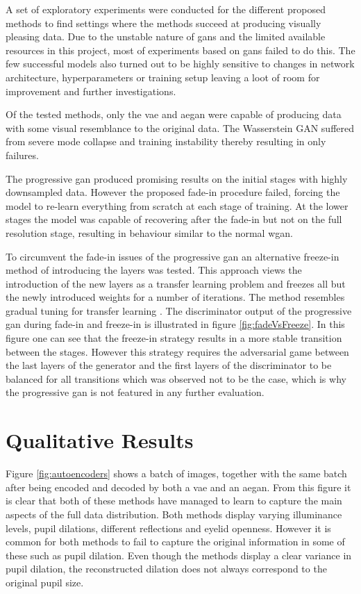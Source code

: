 A set of exploratory experiments were conducted for the different proposed methods to find settings where the methods succeed at producing visually pleasing data. Due to the unstable nature of \acrshort{gans} and the limited available resources in this project, most of experiments based on \acrshort{gans} failed to do this. The few successful models also turned out to be highly sensitive to changes in network architecture, hyperparameters or training setup leaving a loot of room for improvement and further investigations. 

Of the tested methods, only the \acrshort{vae} and \acrshort{aegan} were capable of producing data with some visual resemblance to the original data. The Wasserstein GAN suffered from severe mode collapse and training instability thereby resulting in only failures.

The progressive \acrshort{gan} produced promising results on the initial stages with highly downsampled data. However the proposed fade-in procedure failed, forcing the model to re-learn everything from scratch at each stage of training. At the lower stages the model was capable of recovering after the fade-in but not on the full resolution stage, resulting in behaviour similar to the normal \acrshort{wgan}. 

To circumvent the fade-in issues of the progressive \acrshort{gan} an alternative freeze-in method of introducing the layers was tested. This approach views the introduction of the new layers as a transfer learning problem and freezes all but the newly introduced weights for a number of iterations. The method resembles gradual tuning for transfer learning \parencite{montone2017gradual}. The discriminator output of the progressive \acrshort{gan} during fade-in and freeze-in is illustrated in figure \ref{fig:fadeVsFreeze}. In this figure one can see that the freeze-in strategy results in a more stable transition between the stages. However this strategy requires the adversarial game between the last layers of the generator and the first layers of the discriminator to be balanced for all transitions which was observed not to be the case, which is why the progressive \acrshort{gan} is not featured in any further evaluation.

\section{Qualitative Results}
Figure \ref{fig:autoencoders} shows a batch of images, together with the same batch after being encoded and decoded by both a \acrshort{vae} and an \acrshort{aegan}. From this figure it is clear that both of these methods have managed to learn to capture the main aspects of the full data distribution. Both methods display varying illuminance levels, pupil dilations, different reflections and eyelid openness. However it is common for both methods to fail to capture the original information in some of these such as pupil dilation. Even though the methods display a clear variance in pupil dilation, the reconstructed dilation does not always correspond to the original pupil size.

